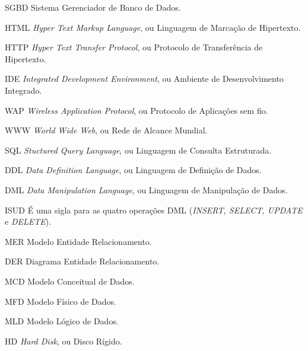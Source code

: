 \begin{siglas}
	\item[SGBD] Sistema Gerenciador de Banco de Dados.
	\item[HTML] \textit{Hyper Text Markup Language}, ou Linguagem de Marcação de Hipertexto.
	\item[HTTP] \textit{Hyper Text Transfer Protocol}, ou Protocolo de Transferência de Hipertexto.
	\item[IDE]	\textit{Integrated Development Environment}, ou Ambiente de Desenvolvimento Integrado.
	\item[WAP]	\textit{Wireless Application Protocol}, ou Protocolo de Aplicações sem fio.
	\item[WWW]	\textit{World Wide Web}, ou Rede de Alcance Mundial.
	\item[SQL]	\textit{Stuctured Query Language}, ou Linguagem de Consulta Estruturada.
	\item[DDL]	\textit{Data Definition Language}, ou Linguagem de Definição de Dados.
	\item[DML]	\textit{Data Manipulation Language}, ou Linguagem de Manipulação de Dados.
	\item[ISUD]	É uma sigla para as quatro operações DML (\textit{INSERT, SELECT, UPDATE} e \textit{DELETE}).
	\item[MER]	Modelo Entidade Relacionamento. 
	\item[DER]	Diagrama Entidade Relacionamento.
	\item[MCD]	Modelo Conceitual de Dados. 
	\item[MFD]	Modelo Físico de Dados. 
	\item[MLD]	Modelo Lógico de Dados. 
	\item[HD]	\textit{Hard Disk}, ou Disco Rígido. 

	
\end{siglas}